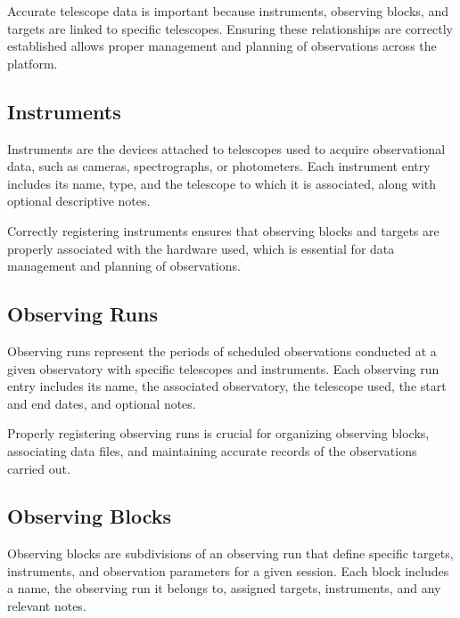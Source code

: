 Accurate telescope data is important because instruments, observing blocks, and targets are linked to specific telescopes. Ensuring these relationships are correctly established allows proper management and planning of observations across the platform.

\subsection{Instruments}

Instruments are the devices attached to telescopes used to acquire observational data, such as cameras, spectrographs, or photometers. Each instrument entry includes its name, type, and the telescope to which it is associated, along with optional descriptive notes.


Correctly registering instruments ensures that observing blocks and targets are properly associated with the hardware used, which is essential for data management and planning of observations.


\subsection{Observing Runs}

Observing runs represent the periods of scheduled observations conducted at a given observatory with specific telescopes and instruments. Each observing run entry includes its name, the associated observatory, the telescope used, the start and end dates, and optional notes.


Properly registering observing runs is crucial for organizing observing blocks, associating data files, and maintaining accurate records of the observations carried out.



\subsection{Observing Blocks}

Observing blocks are subdivisions of an observing run that define specific targets, instruments, and observation parameters for a given session. Each block includes a name, the observing run it belongs to, assigned targets, instruments, and any relevant notes.


